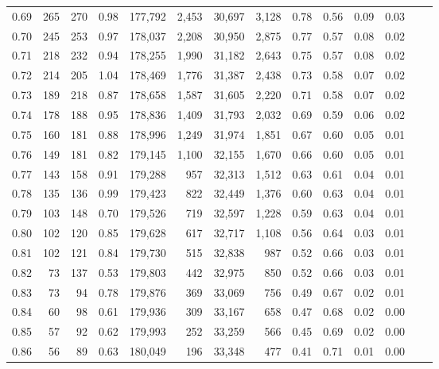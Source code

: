 \begin{tabular}{rrrrrrrrrrrrrr}
0.69 &    265 &  270 &    0.98 &  177,792 &    2,453 &  30,697 &   3,128 &  0.78 &  0.56 &  0.09 &      0.03 \\
0.70 &    245 &  253 &    0.97 &  178,037 &    2,208 &  30,950 &   2,875 &  0.77 &  0.57 &  0.08 &      0.02 \\
0.71 &    218 &  232 &    0.94 &  178,255 &    1,990 &  31,182 &   2,643 &  0.75 &  0.57 &  0.08 &      0.02 \\
0.72 &    214 &  205 &    1.04 &  178,469 &    1,776 &  31,387 &   2,438 &  0.73 &  0.58 &  0.07 &      0.02 \\
0.73 &    189 &  218 &    0.87 &  178,658 &    1,587 &  31,605 &   2,220 &  0.71 &  0.58 &  0.07 &      0.02 \\
0.74 &    178 &  188 &    0.95 &  178,836 &    1,409 &  31,793 &   2,032 &  0.69 &  0.59 &  0.06 &      0.02 \\
0.75 &    160 &  181 &    0.88 &  178,996 &    1,249 &  31,974 &   1,851 &  0.67 &  0.60 &  0.05 &      0.01 \\
0.76 &    149 &  181 &    0.82 &  179,145 &    1,100 &  32,155 &   1,670 &  0.66 &  0.60 &  0.05 &      0.01 \\
0.77 &    143 &  158 &    0.91 &  179,288 &      957 &  32,313 &   1,512 &  0.63 &  0.61 &  0.04 &      0.01 \\
0.78 &    135 &  136 &    0.99 &  179,423 &      822 &  32,449 &   1,376 &  0.60 &  0.63 &  0.04 &      0.01 \\
0.79 &    103 &  148 &    0.70 &  179,526 &      719 &  32,597 &   1,228 &  0.59 &  0.63 &  0.04 &      0.01 \\
0.80 &    102 &  120 &    0.85 &  179,628 &      617 &  32,717 &   1,108 &  0.56 &  0.64 &  0.03 &      0.01 \\
0.81 &    102 &  121 &    0.84 &  179,730 &      515 &  32,838 &     987 &  0.52 &  0.66 &  0.03 &      0.01 \\
0.82 &     73 &  137 &    0.53 &  179,803 &      442 &  32,975 &     850 &  0.52 &  0.66 &  0.03 &      0.01 \\
0.83 &     73 &   94 &    0.78 &  179,876 &      369 &  33,069 &     756 &  0.49 &  0.67 &  0.02 &      0.01 \\
0.84 &     60 &   98 &    0.61 &  179,936 &      309 &  33,167 &     658 &  0.47 &  0.68 &  0.02 &      0.00 \\
0.85 &     57 &   92 &    0.62 &  179,993 &      252 &  33,259 &     566 &  0.45 &  0.69 &  0.02 &      0.00 \\
0.86 &     56 &   89 &    0.63 &  180,049 &      196 &  33,348 &     477 &  0.41 &  0.71 &  0.01 &      0.00 \\

\end{tabular}

